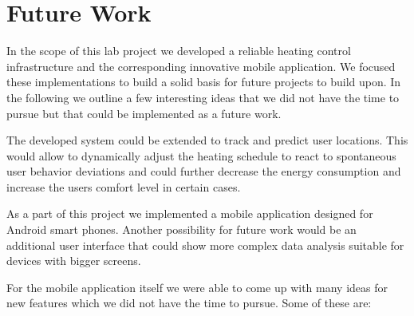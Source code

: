 
\chapter{Future Work}
\label{sec:futurework}


In the scope of this lab project we developed a reliable heating control infrastructure and the corresponding innovative mobile application.
We focused these implementations to build a solid basis for future projects to build upon.
In the following we outline a few interesting ideas that we did not have the time to pursue but that could be implemented as a future work.

The developed system could be extended to track and predict user locations.
This would allow to dynamically adjust the heating schedule to react to spontaneous user behavior deviations and could further decrease the energy consumption and increase the users comfort level in certain cases.

As a part of this project we implemented a mobile application designed for Android smart phones.
Another possibility for future work would be an additional user interface that could show more complex data analysis suitable for devices with bigger screens.

For the mobile application itself we were able to come up with many ideas for new features which we did not have the time to pursue. Some of these are:

